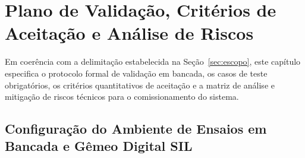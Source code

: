
\chapter{Plano de Validação, Critérios de Aceitação e Análise de Riscos}
\label{cap:plano_validacao}

Em coerência com a delimitação estabelecida na Seção~\ref{sec:escopo}, este capítulo especifica o protocolo formal de validação em bancada, os casos de teste obrigatórios, os critérios quantitativos de aceitação e a matriz de análise e mitigação de riscos técnicos para o comissionamento do sistema.

\section{Configuração do Ambiente de Ensaios em Bancada e Gêmeo Digital SIL}
\label{sec:val_ambiente}


